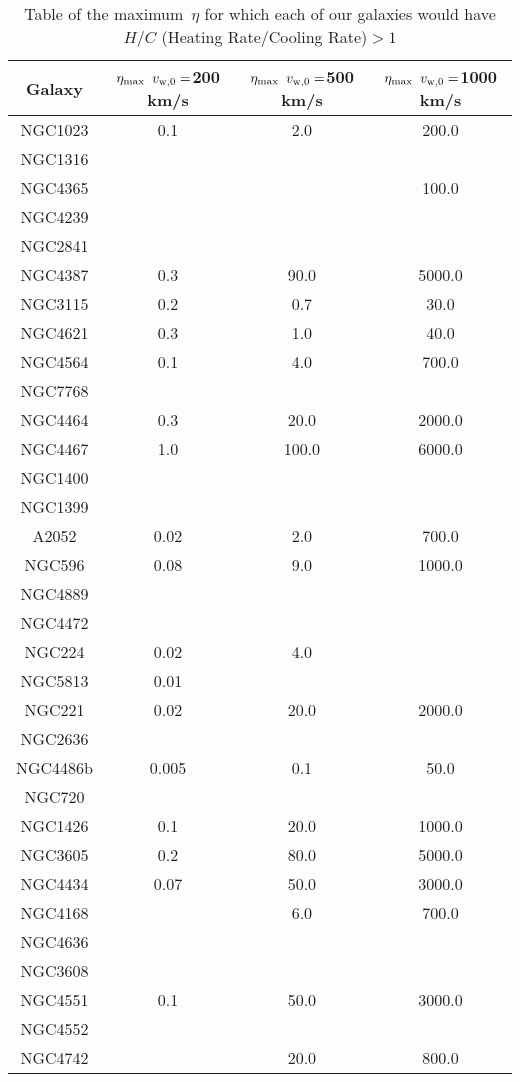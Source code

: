 \begin{table*}
\caption{\label{tab:eta} Table of the maximum\
 $\eta$ for which each of our galaxies would have $H/C$ (Heating Rate/Cooling Rate)$>1$}
\begin{tabular}{cccc}
\hline
Galaxy & $\eta_{\rm max}$ $v_{\rm w,0}=$200 km/s & $\eta_{\rm max}$ $v_{\rm w,0}=$500 km/s & $\eta_{\rm max}$ $v_{\rm w,0}=$1000 km/s \\
\hline
NGC1023 & 0.1 & 2.0 & 200.0 \\
NGC1316 &  &  &  \\
NGC4365 &  &  & 100.0 \\
NGC4239 &  &  &  \\
NGC2841 &  &  &  \\
NGC4387 & 0.3 & 90.0 & 5000.0 \\
NGC3115 & 0.2 & 0.7 & 30.0 \\
NGC4621 & 0.3 & 1.0 & 40.0 \\
NGC4564 & 0.1 & 4.0 & 700.0 \\
NGC7768 &  &  &  \\
NGC4464 & 0.3 & 20.0 & 2000.0 \\
NGC4467 & 1.0 & 100.0 & 6000.0 \\
NGC1400 &  &  &  \\
NGC1399 &  &  &  \\
A2052 & 0.02 & 2.0 & 700.0 \\
NGC596 & 0.08 & 9.0 & 1000.0 \\
NGC4889 &  &  &  \\
NGC4472 &  &  &  \\
NGC224 & 0.02 & 4.0 &  \\
NGC5813 & 0.01 &  &  \\
NGC221 & 0.02 & 20.0 & 2000.0 \\
NGC2636 &  &  &  \\
NGC4486b & 0.005 & 0.1 & 50.0 \\
NGC720 &  &  &  \\
NGC1426 & 0.1 & 20.0 & 1000.0 \\
NGC3605 & 0.2 & 80.0 & 5000.0 \\
NGC4434 & 0.07 & 50.0 & 3000.0 \\
NGC4168 &  & 6.0 & 700.0 \\
NGC4636 &  &  &  \\
NGC3608 &  &  &  \\
NGC4551 & 0.1 & 50.0 & 3000.0 \\
NGC4552 &  &  &  \\
NGC4742 &  & 20.0 & 800.0 \\

\end{tabular}
\end{table*}
